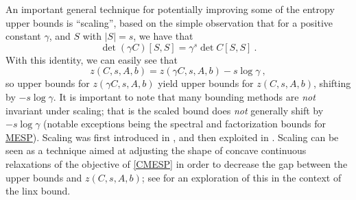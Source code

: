 \documentclass[smallextended]{svjour3hack}       %
\makeatletter
\DeclareMathOperator{\Diag}{Diag}
\renewcommand*{\top}{%
  {\mathpalette\@transpose{}}%
}
\newcommand*{\@transpose}[2]{%
  \raisebox{\depth}{$\m@th#1\mathsf{T}$}%
}
\makeatother
\begin{document}
An important general technique for potentially improving some of the
entropy upper bounds is ``scaling'',
based on the simple observation that
for a positive constant $\gamma$, and $S$
with $|S|=s$, we have that
\[
\det (\gamma C)[S,S] = \gamma^s \det C[S,S]~.
\]
With this identity,  we can easily see that
\[
z(C,s, A, b) = z(\gamma C,s, A, b) -s \log \gamma~,
\]
so upper bounds for $z(\gamma C,s, A, b)$
 yield upper bounds for $z(C,s, A, b)$,
shifting by $-s \log \gamma$.
It is important to note that many bounding methods are \emph{not} invariant under
scaling; that is the scaled bound does \emph{not} generally  shift by $-s\log \gamma$ (notable exceptions being the spectral and factorization bounds for \hyperlink{MESP}{MESP}).
Scaling was first introduced in \cite{AFLW_IPCO,AFLW_Using}, and then exploited in \cite{Anstreicher_BQP_entropy,Kurt_linx,Al-ThaniLee1,chen_mixing,chen2022masking,chen2023computing}. Scaling can be seen as a technique aimed at adjusting the shape of  concave continuous relaxations of the objective of \ref{CMESP} in order to decrease the gap between the upper bounds and $z(C,s, A, b)$; see \cite{chen2022masking} for an exploration of this in the context of the linx bound.

\end{document}
